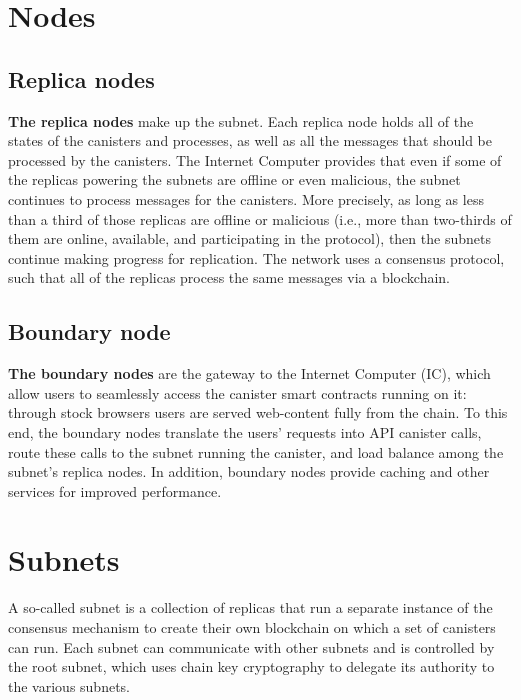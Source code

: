 \section{Nodes}

\subsection{Replica nodes}

  \textbf{The replica nodes} make up the subnet. Each replica node holds all of the states of the canisters and processes, as well as all the messages that should be processed by the canisters. The Internet Computer provides that even if some of the replicas powering the subnets are offline or even malicious, the subnet continues to process messages for the canisters. More precisely, as long as less than a third of those replicas are offline or malicious (i.e., more than two-thirds of them are online, available, and participating in the protocol), then the subnets continue making progress for replication. The network uses a consensus protocol, such that all of the replicas process the same messages via a blockchain.

\subsection{Boundary node}

  \textbf{The boundary nodes} are the gateway to the Internet Computer (IC), which allow users to seamlessly access the canister smart contracts running on it: through stock browsers users are served web-content fully from the chain. To this end, the boundary nodes translate the users' requests into API canister calls, route these calls to the subnet running the canister, and load balance among the subnet's replica nodes. In addition, boundary nodes provide caching and other services for improved performance.



\section{Subnets}

A so-called subnet is a collection of replicas that run a separate instance of the consensus mechanism to create their own blockchain on which a set of canisters can run. Each subnet can communicate with other subnets and is controlled by the root subnet, which uses chain key cryptography to delegate its authority to the various subnets.




